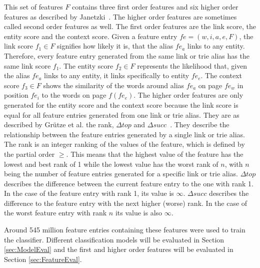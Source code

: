 This set of features $F$ contains three first order features and six higher order features as described by Janetzki\ \cite{janetzki}. The higher order features are sometimes called second order features as well. The first order features are the link score, the entity score and the context score. Given a feature entry $fe = (w,i,a,e,F)$, the link score $f_1 \in F$ signifies how likely it is, that the alias $fe_a$ links to any entity. Therefore, every feature entry generated from the same link or trie alias has the same link score $f_1$. The entity score $f_2 \in F$ represents the likelihood that, given the alias $fe_a$ links to any entity, it links specifically to entity $fe_e$. The context score $f_3 \in F$ shows the similarity of the words around alias $fe_a$ on page $fe_w$ in position $fe_i$ to the words on page $f(fe_e)$. The higher order features are only generated for the entity score and the context score because the link score is equal for all feature entries generated from one link or trie alias. They are as described by Grütze et al. the rank, $\Delta top$ and $\Delta succ$\ \cite{coheel}. They describe the relationship between the feature entries generated by a single link or trie alias. The rank is an integer ranking of the values of the feature, which is defined by the partial order $\geq$. This means that the highest value of the feature has the lowest and best rank of 1 while the lowest value has the worst rank of $n$, with $n$ being the number of feature entries generated for a specific link or trie alias. $\Delta top$ describes the difference between the current feature entry to the one with rank 1. In the case of the feature entry with rank 1, its value is $\infty$. $\Delta succ$ describes the difference to the feature entry with the next higher (worse) rank. In the case of the worst feature entry with rank $n$ its value is also $\infty$.\par
Around 545 million feature entries containing these features were used to train the classifier. Different classification models will be evaluated in Section \ref{sec:ModelEval} and the first and higher order features will be evaluated in Section \ref{sec:FeatureEval}.

